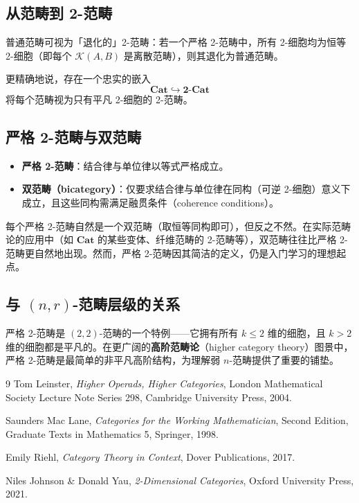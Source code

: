 \documentclass[UTF8,a4paper,12pt]{ctexart}
\theoremstyle{definition}
\theoremstyle{plain}
\newcommand{\cat}[1]{\mathcal{#1}}
\begin{document}
\subsection{从范畴到 2-范畴}

普通范畴可视为「退化的」2-范畴：若一个严格 2-范畴中，所有 2-细胞均为恒等 2-细胞（即每个 $\cat{K}(A,B)$ 是离散范畴），则其退化为普通范畴。

更精确地说，存在一个忠实的嵌入
\[
\mathbf{Cat} \hookrightarrow \mathbf{2\text{-}Cat}
\]
将每个范畴视为只有平凡 2-细胞的 2-范畴。

\subsection{严格 2-范畴与双范畴}

\begin{itemize}
  \item \textbf{严格 2-范畴}：结合律与单位律以等式严格成立。
  \item \textbf{双范畴（bicategory）}：仅要求结合律与单位律在同构（可逆 2-细胞）意义下成立，且这些同构需满足融贯条件（coherence conditions）。
\end{itemize}

每个严格 2-范畴自然是一个双范畴（取恒等同构即可），但反之不然。在实际范畴论的应用中（如 $\mathbf{Cat}$ 的某些变体、纤维范畴的 2-范畴等），双范畴往往比严格 2-范畴更自然地出现。然而，严格 2-范畴因其简洁的定义，仍是入门学习的理想起点。

\subsection{与 $(n,r)$-范畴层级的关系}

严格 2-范畴是 $(2,2)$-范畴的一个特例——它拥有所有 $k \leq 2$ 维的细胞，且 $k > 2$ 维的细胞都是平凡的。在更广阔的\textbf{高阶范畴论}（higher category theory）图景中，严格 2-范畴是最简单的非平凡高阶结构，为理解弱 $n$-范畴提供了重要的铺垫。

\begin{thebibliography}{9}
  Tom Leinster,
  \textit{Higher Operads, Higher Categories},
  London Mathematical Society Lecture Note Series 298,
  Cambridge University Press, 2004.

  Saunders Mac Lane,
  \textit{Categories for the Working Mathematician},
  Second Edition,
  Graduate Texts in Mathematics 5,
  Springer, 1998.

  Emily Riehl,
  \textit{Category Theory in Context},
  Dover Publications, 2017.

  Niles Johnson \& Donald Yau,
  \textit{2-Dimensional Categories},
  Oxford University Press, 2021.
\end{thebibliography}
\end{document}
